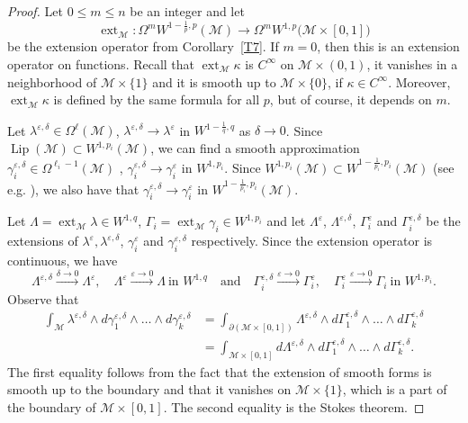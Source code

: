 \documentclass[intlimits,12pt,reqno]{amsart}
\newcommand{\cM}{\mathcal M}
\newcommand{\eps}{\varepsilon}
\numberwithin{equation}{section}
\def\lip{\operatorname{Lip}}
\def\ext{\operatorname{ext}}
\theoremstyle{definition}
\begin{document}
\begin{proof}
Let $0\leq m\leq n$ be an integer and let
$$
\ext_{\cM}:\Omega^m W^{1-\frac{1}{p},p}\left(\cM\right)\to \Omega^m W^{1,p}\big(\cM\times [0,1]\big)
$$
be the extension operator from Corollary~\ref{T7}. If $m=0$, then this is an extension operator on functions.
Recall that $\ext_{\cM}\kappa$ is $C^\infty$ on $\cM\times (0,1)$, it vanishes in a neighborhood of $\cM\times\{1\}$ and it is smooth up to $\cM\times\{0\}$, if $\kappa\in C^\infty$. Moreover, $\ext_{\cM}\kappa$ is defined by the same formula for all $p$, but of course, it depends on $m$. 

Let $\lambda^{\eps,\delta}\in \Omega^\ell(\cM)$, $\lambda^{\eps,\delta}\to\lambda^\eps$ in $W^{1-\frac{1}{q},q}$ as $\delta\to 0$.
Since $\lip(\cM)\subset W^{1,p_i}(\cM)$, we can find a smooth approximation 
$\gamma_i^{\eps,\delta}\in\Omega^{\ell_i-1}(\cM)$ , $\gamma_i^{\eps,\delta}\to\gamma_i^\eps$ in $W^{1,p_i}$. Since $W^{1,p_i}(\cM)\subset W^{1-\frac{1}{p_i},p_i}(\cM)$ (see e.g. \cite[Proposition~28]{GoldsteinH}), we also have that $\gamma_i^{\eps,\delta}\to \gamma_i^\eps$ in $W^{1-\frac{1}{p_i}, p_i}(\cM)$.

Let $\Lambda=\ext_{\cM}\lambda\in W^{1,q}$, $\Gamma_i=\ext_{\cM} \gamma_i\in W^{1,p_i}$ 
and let $\Lambda^\eps$, $\Lambda^{\eps,\delta}$, $\Gamma_i^\eps$ and $\Gamma_i^{\eps,\delta}$ be the extensions of $\lambda^\eps, \lambda^{\eps,\delta}$, $\gamma_i^\eps$ and $\gamma_i^{\eps,\delta}$ respectively. Since the extension operator is continuous, we have
$$
\Lambda^{\eps,\delta}
\xrightarrow{\delta\to 0}\Lambda^\eps,
\quad
\Lambda^\eps\xrightarrow{\eps\to 0}\Lambda \ \text{in $W^{1,q}$}
\quad
\text{and}
\quad
\Gamma_i^{\eps,\delta}\xrightarrow{\eps\to 0}\Gamma_i^\eps,
\quad
\Gamma_i^\eps\xrightarrow{\eps\to 0}\Gamma_i 
\ \text{in $W^{1,p_i}$}.
$$
Observe that
\[
\begin{split}
\int_{\cM} \lambda^{\eps,\delta}\wedge d\gamma_1^{\eps,\delta}\wedge\ldots\wedge d\gamma_k^{\eps,\delta}
&=
\int_{\partial(\cM\times [0,1])}\Lambda^{\eps,\delta}\wedge d\Gamma_1^{\eps,\delta}\wedge\ldots\wedge d\Gamma_{k}^{\eps,\delta}\\
&= 
\int_{\cM\times [0,1]}d\Lambda^{\eps,\delta}\wedge d\Gamma_1^{\eps,\delta}\wedge\ldots\wedge d\Gamma_{k}^{\eps,\delta}.
\end{split}
\]
The first equality follows from the fact that the extension of smooth forms is smooth up to the boundary and that it
vanishes on $\cM\times\{1\}$, which is a part of the boundary of $\cM\times[0,1]$.
The second equality is the Stokes theorem.


\end{proof}
\end{document}
